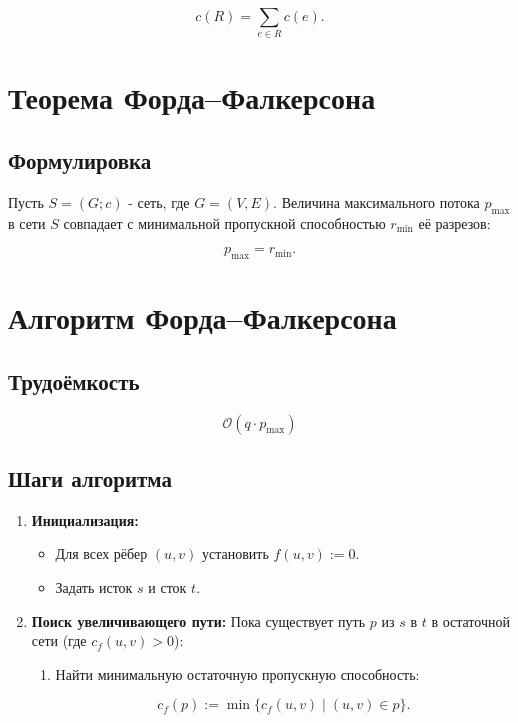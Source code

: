 {\[
c(R) = \sum_{e \in R} c(e).
\]

\section*{Теорема Форда–Фалкерсона}

\subsection*{Формулировка}
Пусть $S = (G; c)$ - сеть, где $G = (V, E)$.  
Величина максимального потока $p_{\text{max}}$ в сети $S$ совпадает с минимальной пропускной способностью $r_{\text{min}}$ её разрезов:


\[
p_{\text{max}} = r_{\text{min}}.
\]



\section*{Алгоритм Форда–Фалкерсона}

\subsection*{Трудоёмкость}


\[
\mathcal{O}(q \cdot p_{\text{max}})
\]



\subsection*{Шаги алгоритма}

\begin{enumerate}
  \item \textbf{Инициализация:}
  \begin{itemize}
    \item Для всех рёбер $(u, v)$ установить $f(u, v) := 0$.
    \item Задать исток $s$ и сток $t$.
  \end{itemize}

  \item \textbf{Поиск увеличивающего пути:}  
  Пока существует путь $p$ из $s$ в $t$ в остаточной сети (где $c_f(u, v) > 0$):
  \begin{enumerate}
    \item Найти минимальную остаточную пропускную способность:
    

\[
    c_f(p) := \min\{c_f(u, v) \mid (u, v) \in p\}.
    \]



\end{enumerate}
\end{enumerate}}

